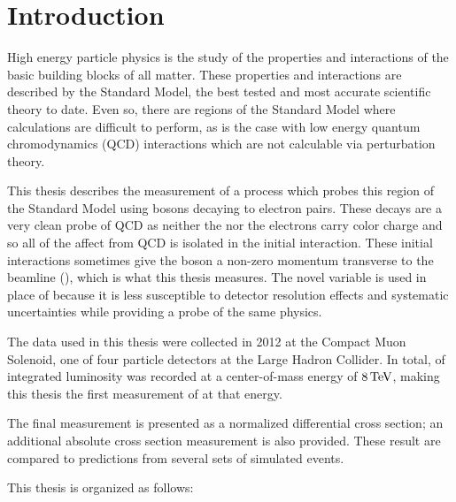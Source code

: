 \chapter{Introduction}
\label{chapter:intro}

High energy particle physics is the study of the properties and interactions of
the basic building blocks of all matter. These properties and interactions are
described by the Standard Model, the best tested and most accurate scientific
theory to date. Even so, there are regions of the Standard Model where
calculations are difficult to perform, as is the case with low energy quantum
chromodynamics (QCD) interactions which are not calculable via perturbation
theory.

This thesis describes the measurement of a process which probes this region of
the Standard Model using \Z bosons decaying to electron pairs. These decays are
a very clean probe of QCD as neither the \Z nor the electrons carry color
charge and so all of the affect from QCD is isolated in the initial
interaction. These initial interactions sometimes give the \Z boson a non-zero
momentum transverse to the beamline (\bosonpt), which is what this thesis
measures. The novel variable \phistar is used in place of \bosonpt because it
is less susceptible to detector resolution effects and systematic uncertainties
while providing a probe of the same physics.

The data used in this thesis were collected in 2012 at the Compact Muon
Solenoid, one of four particle detectors at the Large Hadron Collider. In
total, \GoodLumiNumber of integrated luminosity was recorded at a
center-of-mass energy of $8 \,\text{Te\hspace{-.08em}V}$, making this thesis the first measurement of
\phistar at that energy.

The final measurement is presented as a normalized differential cross section;
an additional absolute cross section measurement is also provided. These result
are compared to predictions from several sets of simulated events.

This thesis is organized as follows:

